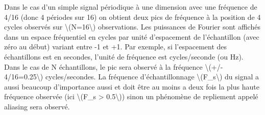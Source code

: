 \documentclass[
]{article}
\begin{document}
Dans le cas d'un simple signal périodique à une dimension avec une
fréquence de 4/16 (donc 4 périodes sur 16) on obtient deux pics de
fréquence à la position de 4 cycles observés sur
{\textbackslash(N=16\textbackslash)} observations. Les puissances de
Fourier sont affichés dans un espace fréquentiel en cycles par unité
d'espacement de l'échantillon (avec zéro au début) variant entre -1 et
+1. Par exemple, si l'espacement des échantillons est en secondes,
l'unité de fréquence est cycles/seconde (ou Hz). Dans le cas de N
échantillons, le pic sera observé à la fréquence {\textbackslash(+/-
4/16=0.25\textbackslash)} cycles/secondes. La fréquence
d'échantillonnage {\textbackslash(F\_s\textbackslash)} du signal a aussi
beaucoup d'importance aussi et doit être au moins a deux fois la plus
haute fréquence observée (ici {\textbackslash(F\_s \textgreater{}
0.5\textbackslash)}) sinon un phénomène de repliement appelé aliasing
sera observé.
\end{document}
